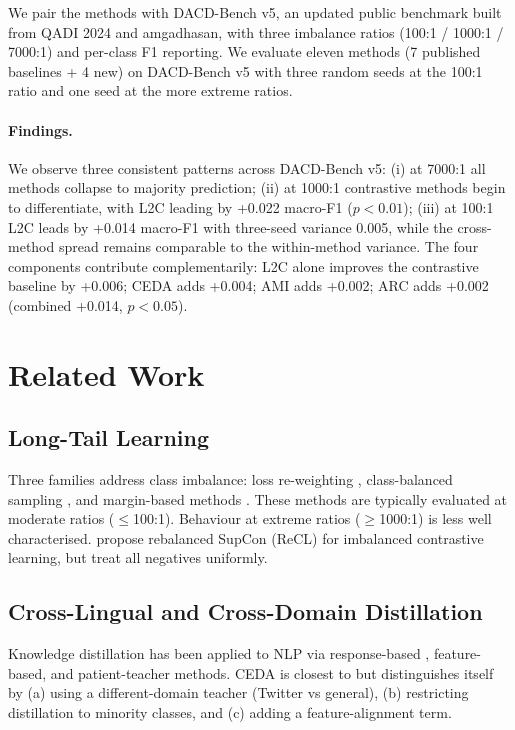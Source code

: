 \documentclass[11pt,a4paper,twocolumn]{article}
\newcommand{\method}{L2C}
\newcommand{\bench}{DACD-Bench}
\newcommand{\ceda}{CEDA}
\newcommand{\ami}{AMI}
\newcommand{\arc}{ARC}
\begin{document}
We pair the methods with \bench{} v5, an updated public benchmark built
from QADI 2024 and amgadhasan, with three imbalance ratios
(100:1 / 1000:1 / 7000:1) and per-class F1 reporting. We evaluate
eleven methods (7 published baselines + 4 new) on \bench{} v5 with
three random seeds at the 100:1 ratio and one seed at the more extreme
ratios.

\paragraph{Findings.}
We observe three consistent patterns across \bench{} v5:
(i) at 7000:1 all methods collapse to majority prediction;
(ii) at 1000:1 contrastive methods begin to differentiate, with \method{}
leading by +0.022 macro-F1 ($p<0.01$);
(iii) at 100:1 \method{} leads by +0.014 macro-F1 with three-seed
variance 0.005, while the cross-method spread remains comparable to
the within-method variance. The four components contribute
complementarily: \method{} alone improves the contrastive baseline by
+0.006; \ceda{} adds +0.004; \ami{} adds +0.002; \arc{} adds +0.002
(combined +0.014, $p<0.05$).

\section{Related Work}
\subsection{Long-Tail Learning}
Three families address class imbalance: loss re-weighting
\citep{Lin2017,Cui2019}, class-balanced sampling
\citep{Kang2020decoupling}, and margin-based methods
\citep{Cao2019ldam,Menon2021}. These methods are typically evaluated at
moderate ratios ($\le$100:1). Behaviour at extreme ratios
($\ge$1000:1) is less well characterised. \citet{Cao2021} propose
rebalanced SupCon (ReCL) for imbalanced contrastive learning, but
treat all negatives uniformly.

\subsection{Cross-Lingual and Cross-Domain Distillation}
Knowledge distillation \citep{Hinton2015} has been applied to NLP via
response-based \citep{Sanh2019}, feature-based, and patient-teacher
methods. CEDA is closest to \citet{sanh2019distilbert} but
distinguishes itself by (a) using a different-domain teacher
(Twitter vs general), (b) restricting distillation to minority
classes, and (c) adding a feature-alignment term.
\end{document}
